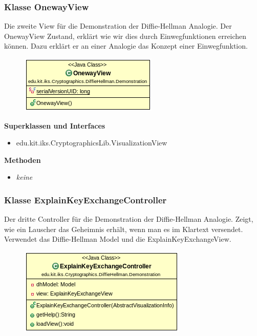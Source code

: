 \documentclass{article}
\begin{document}
\subsubsection{Klasse OnewayView}
      Die zweite View für die Demonstration der Diffie-Hellman Analogie.
      Der OnewayView Zustand, erklärt wie wir dies durch Einwegfunktionen
      erreichen können. Dazu erklärt er an einer Analogie das Konzept
      einer Einwegfunktion.

      \begin{figure}[H]
        \centering
        \includegraphics{resources/edu-kit-iks-Cryptographics-DiffieHellman-Demonstration-OnewayView}
      \end{figure}

      \textbf{Superklassen und Interfaces}
      \begin{itemize}
        \item edu.kit.iks.CryptographicsLib.VisualizationView
      \end{itemize}

      \textbf{Methoden}
      \begin{itemize}
        \item \textit{keine}
      \end{itemize}

\subsubsection{Klasse ExplainKeyExchangeController}
      Der dritte Controller für die Demonstration der Diffie-Hellman Analogie.
      Zeigt, wie ein Lauscher das Geheimnis erhält, wenn man es
      im Klartext versendet.
      Verwendet das Diffie-Hellman Model und die ExplainKeyExchangeView.

      \begin{figure}[H]
        \centering
        \includegraphics{resources/edu-kit-iks-Cryptographics-DiffieHellman-Demonstration-ExplainKeyExchangeController}
      \end{figure}
\end{document}
